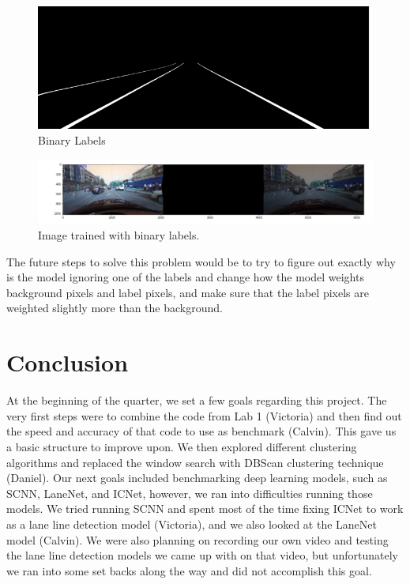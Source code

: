 \documentclass[twoside,twocolumn]{article}
\begin{document}
\begin{figure}
  \includegraphics[width=\linewidth]{9.png}
  \caption{Binary Labels}
  \label{fig:labels2}
\end{figure}

\begin{figure}
  \includegraphics[width=\linewidth]{8.png}
  \caption{Image trained with binary labels.}
  \label{fig:badbad}
\end{figure}

\par The future steps to solve this problem would be to try to figure out exactly why is the model ignoring one of the labels and change how the model weights background pixels and label pixels, and make sure that the label pixels are weighted slightly more than the background.


\section{Conclusion}
At the beginning of the quarter, we set a few goals regarding this project. The very first steps were to combine the code from Lab 1 (Victoria) and then find out the speed and accuracy of that code to use as benchmark (Calvin). This gave us a basic structure to improve upon. We then explored different clustering algorithms and replaced the window search with DBScan clustering technique (Daniel). Our next goals included benchmarking deep learning models, such as SCNN, LaneNet, and ICNet, however, we ran into difficulties running those models. We tried running SCNN and spent most of the time fixing ICNet to work as a lane line detection model (Victoria), and we also looked at the LaneNet model (Calvin). We were also planning on recording our own video and testing the lane line detection models we came up with on that video, but unfortunately we ran into some set backs along the way and did not accomplish this goal.

\end{document}
